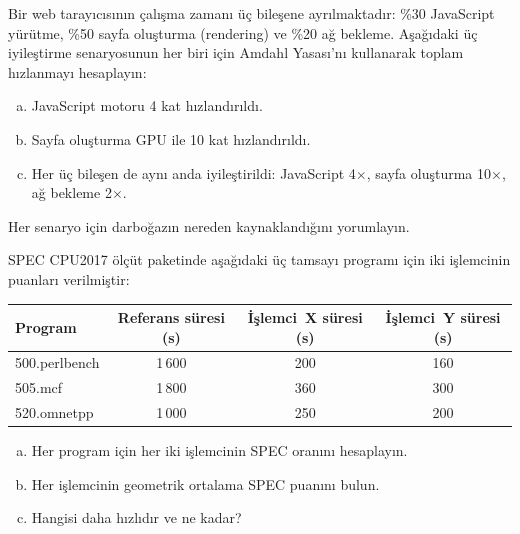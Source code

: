 \begin{alistirma}[\orta]
Bir web tarayıcısının çalışma zamanı üç bileşene ayrılmaktadır: \%30 JavaScript yürütme, \%50 sayfa oluşturma (rendering) ve \%20 ağ bekleme. Aşağıdaki üç iyileştirme senaryosunun her biri için Amdahl Yasası'nı kullanarak toplam hızlanmayı hesaplayın:
\begin{enumerate}[(a)]
    \item JavaScript motoru 4 kat hızlandırıldı.
    \item Sayfa oluşturma GPU ile 10 kat hızlandırıldı.
    \item Her üç bileşen de aynı anda iyileştirildi: JavaScript 4$\times$, sayfa oluşturma 10$\times$, ağ bekleme 2$\times$.
\end{enumerate}
Her senaryo için darboğazın nereden kaynaklandığını yorumlayın.
\end{alistirma}

\begin{alistirma}[\zor]
SPEC CPU2017 ölçüt paketinde aşağıdaki üç tamsayı programı için iki işlemcinin puanları verilmiştir:

\begin{center}
\small
\begin{tabular}{lccc}
\toprule
\textbf{Program} & \textbf{Referans süresi (s)} & \textbf{İşlemci~X süresi (s)} & \textbf{İşlemci~Y süresi (s)} \\
\midrule
500.perlbench & 1\,600 & 200 & 160 \\
505.mcf       & 1\,800 & 360 & 300 \\
520.omnetpp   & 1\,000 & 250 & 200 \\
\bottomrule
\end{tabular}
\end{center}

\begin{enumerate}[(a)]
    \item Her program için her iki işlemcinin SPEC oranını hesaplayın.
    \item Her işlemcinin geometrik ortalama SPEC puanını bulun.
    \item Hangisi daha hızlıdır ve ne kadar?
\end{enumerate}
\end{alistirma}


